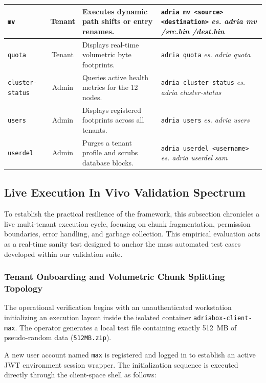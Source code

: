 \begin{table}[htbp]
\begin{tabularx}{\textwidth}{|l|c|X|p{6.2cm}|}
\texttt{mv} & Tenant & Executes dynamic path shifts or entry renames. & \texttt{adria mv <source> <destination>} \newline \textit{es. adria mv /src.bin /dest.bin} \\ \hline
\texttt{quota} & Tenant & Displays real-time volumetric byte footprints. & \texttt{adria quota} \newline \textit{es. adria quota} \\ \hline
\texttt{cluster-status} & Admin & Queries active health metrics for the 12 nodes. & \texttt{adria cluster-status} \newline \textit{es. adria cluster-status} \\ \hline
\texttt{users} & Admin & Displays registered footprints across all tenants. & \texttt{adria users} \newline \textit{es. adria users} \\ \hline
\texttt{userdel} & Admin & Purges a tenant profile and scrubs database blocks. & \texttt{adria userdel <username>} \newline \textit{es. adria userdel sam} \\ \hline
\end{tabularx}
\end{table}

\subsection{Live Execution In Vivo Validation Spectrum}
To establish the practical resilience of the framework, this subsection chronicles a live multi-tenant execution cycle, focusing on chunk fragmentation, permission boundaries, error handling, and garbage collection. This empirical evaluation acts as a real-time sanity test designed to anchor the mass automated test cases developed within our validation suite.

\subsubsection{Tenant Onboarding and Volumetric Chunk Splitting Topology}
The operational verification begins with an unauthenticated workstation initializing an execution layout inside the isolated container \texttt{adriabox-client-max}. The operator generates a local test file containing exactly 512~MB of pseudo-random data (\texttt{512MB.zip}). 

A new user account named \texttt{max} is registered and logged in to establish an active JWT environment session wrapper. The initialization sequence is executed directly through the client-space shell as follows:

